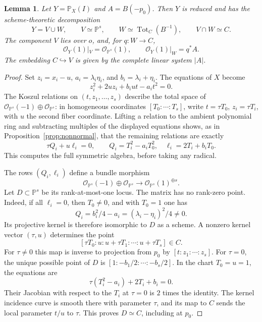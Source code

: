 \documentclass[11pt,reqno]{amsart}
\numberwithin{equation}{section}
\newtheorem{lemma}[theorem]{Lemma}
\theoremstyle{definition}
\theoremstyle{remark}
\newcommand{\OO}{\mathcal O}
\newcommand{\PP}{\mathbb P}
\begin{document}
\begin{lemma}\label{lem:cone-union}
Let $Y=\PP_X(I)$ and $A=B(-p_0)$. Then $Y$ is reduced and has the scheme-theoretic decomposition
\begin{equation}\label{eq:union}
 Y=V\cup W,\qquad V\simeq\PP^s,\qquad
 W\simeq\operatorname{Tot}_C(B^{-1}),\qquad V\cap W\simeq C.
\end{equation}
The component $V$ lies over $o$, and, for $q:W\to C$,
\[
 \OO_Y(1)|_V=\OO_{\PP^s}(1),\qquad\OO_Y(1)|_W=q^*A.
\]
The embedding $C\hookrightarrow V$ is given by the complete linear system $|A|$.
\end{lemma}
\begin{proof}
Set $z_i=x_i-u$, $a_i=\lambda_i\eta_i$, and $b_i=\lambda_i+\eta_i$. The equations of $X$ become
\[
 z_i^2+2uz_i+b_iut-a_it^2=0.
\]
The Koszul relations on $(t,z_1,\ldots,z_s)$ describe the total space of $\OO_{\PP^s}(-1)\oplus\OO_{\PP^s}$: in homogeneous coordinates $[T_0:\cdots:T_s]$, write $t=\tau T_0$, $z_i=\tau T_i$, with $u$ the second fiber coordinate. Lifting a relation to the ambient polynomial ring and subtracting multiples of the displayed equations shows, as in Proposition~\ref{prop:nonnormal}, that the remaining relations are exactly
\begin{equation}\label{eq:matrix-equations}
 \tau Q_i+u\ell_i=0,
 \qquad Q_i=T_i^2-a_iT_0^2,\quad\ell_i=2T_i+b_iT_0.
\end{equation}
This computes the full symmetric algebra, before taking any radical.

The rows $(Q_i,\ell_i)$ define a bundle morphism
\[
 \OO_{\PP^s}(-1)\oplus\OO_{\PP^s}
       \longrightarrow\OO_{\PP^s}(1)^{\oplus s}.
\]
Let $D\subset\PP^s$ be its rank-at-most-one locus. The matrix has no rank-zero point. Indeed, if all $\ell_i=0$, then $T_0\neq0$, and with $T_0=1$ one has
\[
 Q_i=b_i^2/4-a_i=(\lambda_i-\eta_i)^2/4\neq0.
\]
Its projective kernel is therefore isomorphic to $D$ as a scheme. A nonzero kernel vector $(\tau,u)$ determines the point
\[
 [\tau T_0:u:u+\tau T_1:\cdots:u+\tau T_s]\in C.
\]
For $\tau\neq0$ this map is inverse to projection from $p_0$ by $[t:z_1:\cdots:z_s]$. For $\tau=0$, the unique possible point of $D$ is $[1:-b_1/2:\cdots:-b_s/2]$. In the chart $T_0=u=1$, the equations are
\[
 \tau(T_i^2-a_i)+2T_i+b_i=0.
\]
Their Jacobian with respect to the $T_i$ at $\tau=0$ is $2$ times the identity. The kernel incidence curve is smooth there with parameter $\tau$, and its map to $C$ sends the local parameter $t/u$ to $\tau$. This proves $D\simeq C$, including at $p_0$.


\end{proof}
\end{document}
